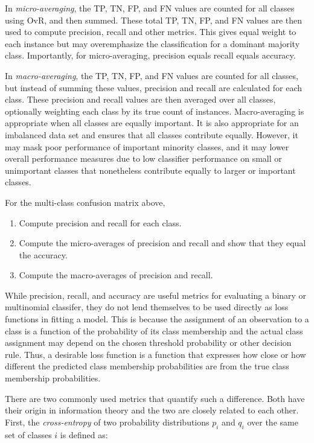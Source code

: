 In \emph{micro-averaging}, the TP, TN, FP, and FN values are counted for all classes using OvR, and then summed. These total TP, TN, FP, and FN values are then used to compute precision, recall and other metrics. This gives equal weight to each instance but may overemphasize the classification for a dominant majority class. Importantly, for micro-averaging, precision equals recall equals accuracy.

In \emph{macro-averaging}, the TP, TN, FP, and FN values are counted for all classes, but instead of summing these values, precision and recall are calculated for each class. These precision and recall values are then averaged over all classes, optionally weighting each class by its true count of instances. Macro-averaging is appropriate when all classes are equally important. It is also appropriate for an imbalanced data set and ensures that all classes contribute equally. However, it may mask poor performance of important minority classes, and it may lower overall performance measures due to low classifier performance on small or unimportant classes that nonetheless contribute equally to larger or important classes. 

\begin{exerciseboxpaper}
For the multi-class confusion matrix above,
\begin{enumerate}
  \item Compute precision and recall for each class.
  \item Compute the micro-averages of precision and recall and show that they equal the accuracy.
  \item Compute the macro-averages of precision and recall.
\end{enumerate}
\end{exerciseboxpaper}

While precision, recall, and accuracy are useful metrics for evaluating a binary or multinomial classifer, they do not lend themselves to be used directly as loss functions in fitting a model. This is because the assignment of an observation to a class is a function of the probability of its class membership and the actual class assignment may depend on the chosen threshold probability or other decision rule. Thus, a desirable loss function is a function that expresses how close or how different the predicted class membership probabilities are from the true class membership probabilities. 

There are two commonly used metrics that quantify such a difference. Both have their origin in information theory and the two are closely related to each other. First, the \emph{cross-entropy} of two probability distributions $p_i$ and $q_i$ over the same set of classes $i$ is defined as:

